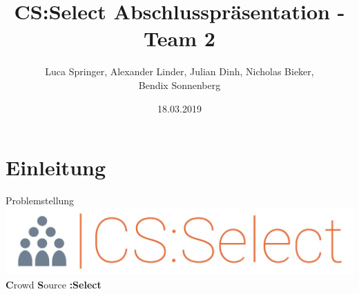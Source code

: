 \documentclass[xcolor=dvipsnames]{beamer}
\title[Team 2 - Abschlusspräsentation]{CS:Select Abschlusspräsentation - Team 2}
\author{Luca Springer, Alexander Linder, Julian Dinh, Nicholas Bieker,\\ Bendix Sonnenberg}
\date{18.03.2019}
\begin{document}
    \frame[plain]{\titlepage}

    \section{Einleitung}

    \begin{frame}{Problemstellung}
        \center
        \includegraphics[width=\textwidth / 2]{img/logo.png} \\
        \textbf{C}rowd \textbf{S}ource \textbf{:Select}
    \end{frame}
    
\end{document}
